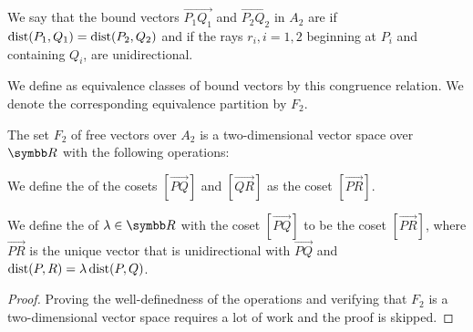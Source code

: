 \begin{definition}\label{def:euclidean_plane_free_vector}
  We say that the bound vectors \( \Vec{P_1 Q_1} \) and \( \Vec{P_2 Q_2} \) in \( A_2 \) are  if \( \operatorname{dist}(P_1, Q_1) = \operatorname{dist}(P_2, Q_2) \) and if the rays \( r_i, i = 1, 2 \) beginning at \( P_i \) and containing \( Q_i \), are unidirectional.

  We define  as equivalence classes of bound vectors by this congruence relation. We denote the corresponding equivalence partition by \( F_2 \).
\end{definition}

\begin{theorem}\label{thm:euclidean_plane_factorization}
  The set \( F_2 \) of free vectors over \( A_2 \) is a two-dimensional vector space over \( \R \) with the following operations:
  \begin{thmenum}
     We define the  of the cosets \( [\Vec{PQ}] \) and \( [\Vec{QR}] \) as the coset \( [\Vec{PR}] \).

     We define the  of \( \lambda \in \R \) with the coset \( [\Vec{PQ}] \) to be the coset \( [\Vec{PR}] \), where \( \Vec{PR} \) is the unique vector that is unidirectional with \( \Vec{PQ} \) and \( \operatorname{dist}(P, R) = \lambda \operatorname{dist}(P, Q) \).
  \end{thmenum}
\end{theorem}
\begin{proof}
  Proving the well-definedness of the operations and verifying that \( F_2 \) is a two-dimensional vector space requires a lot of work and the proof is skipped.
\end{proof}

